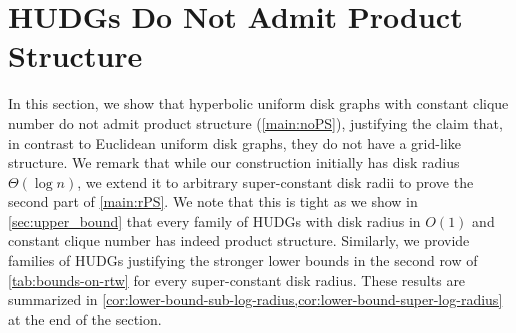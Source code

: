 \documentclass[11pt]{article}
\newcommand{\Thomas}[1]{}
\newcommand{\calG}{\ensuremath{\mathcal{G}}\xspace}
\begin{document}
\section{HUDGs Do Not Admit Product Structure}
\label{sec:large_radii}
\label{sec:lower_bound}
%
%     
%
In this section, we show that hyperbolic uniform disk graphs with constant clique number do not admit product structure (\cref{main:noPS}), justifying the claim that, in contrast to Euclidean uniform disk graphs, they do not have a grid-like structure.
We remark that while our construction initially has disk radius $ \Theta(\log n) $, 
we extend it to arbitrary super-constant disk radii to prove the second part of \cref{main:rPS}.
We note that this is tight as we show in \cref{sec:upper_bound} that every family of HUDGs with disk radius in $O(1)$ and constant clique number has indeed product structure.
Similarly, we provide families of HUDGs justifying the stronger lower bounds in the second row of \cref{tab:bounds-on-rtw} for every super-constant disk radius.
These results are summarized in \cref{cor:lower-bound-sub-log-radius,cor:lower-bound-super-log-radius} at the end of the section.
%
%
\end{document}
